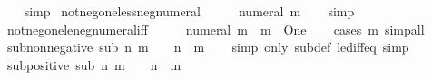 \begin{isabellebody}
%
\isadelimproof
\ \ %
\endisadelimproof
%
\isatagproof
{}\isamarkupfalse%
\ simp%
\endisatagproof
{\isafoldproof}%
%
\isadelimproof
\isanewline
%
\endisadelimproof
\isanewline
{}\isamarkupfalse%
\ not{\isacharunderscore}{\kern0pt}neg{\isacharunderscore}{\kern0pt}one{\isacharunderscore}{\kern0pt}less{\isacharunderscore}{\kern0pt}neg{\isacharunderscore}{\kern0pt}numeral{\isacharcolon}{\kern0pt}\ {\isachardoublequoteopen}{\isasymnot}\ {\isacharminus}{\kern0pt}\ {}\ {\isacharless}{\kern0pt}\ {\isacharminus}{\kern0pt}\ numeral\ m{\isachardoublequoteclose}\isanewline
%
\isadelimproof
\ \ %
\endisadelimproof
%
\isatagproof
{}\isamarkupfalse%
\ simp%
\endisatagproof
{\isafoldproof}%
%
\isadelimproof
\isanewline
%
\endisadelimproof
\isanewline
{}\isamarkupfalse%
\ not{\isacharunderscore}{\kern0pt}neg{\isacharunderscore}{\kern0pt}one{\isacharunderscore}{\kern0pt}le{\isacharunderscore}{\kern0pt}neg{\isacharunderscore}{\kern0pt}numeral{\isacharunderscore}{\kern0pt}iff{\isacharcolon}{\kern0pt}\ {\isachardoublequoteopen}{\isasymnot}\ {\isacharminus}{\kern0pt}\ {}\ {\isasymle}\ {\isacharminus}{\kern0pt}\ numeral\ m\ {\isasymlongleftrightarrow}\ m\ {\isasymnoteq}\ One{\isachardoublequoteclose}\isanewline
%
\isadelimproof
\ \ %
\endisadelimproof
%
\isatagproof
{}\isamarkupfalse%
\ {\isacharparenleft}{\kern0pt}cases\ m{\isacharparenright}{\kern0pt}\ simp{\isacharunderscore}{\kern0pt}all%
\endisatagproof
{\isafoldproof}%
%
\isadelimproof
\isanewline
%
\endisadelimproof
\isanewline
{}\isamarkupfalse%
\ sub{\isacharunderscore}{\kern0pt}non{\isacharunderscore}{\kern0pt}negative{\isacharcolon}{\kern0pt}\ {\isachardoublequoteopen}sub\ n\ m\ {\isasymge}\ {}\ {\isasymlongleftrightarrow}\ n\ {\isasymge}\ m{\isachardoublequoteclose}\isanewline
%
\isadelimproof
\ \ %
\endisadelimproof
%
\isatagproof
{}\isamarkupfalse%
\ {\isacharparenleft}{\kern0pt}simp\ only{\isacharcolon}{\kern0pt}\ sub{\isacharunderscore}{\kern0pt}def\ le{\isacharunderscore}{\kern0pt}diff{\isacharunderscore}{\kern0pt}eq{\isacharparenright}{\kern0pt}\ simp%
\endisatagproof
{\isafoldproof}%
%
\isadelimproof
\isanewline
%
\endisadelimproof
\isanewline
{}\isamarkupfalse%
\ sub{\isacharunderscore}{\kern0pt}positive{\isacharcolon}{\kern0pt}\ {\isachardoublequoteopen}sub\ n\ m\ {\isachargreater}{\kern0pt}\ {}\ {\isasymlongleftrightarrow}\ n\ {\isachargreater}{\kern0pt}\ m{\isachardoublequoteclose}\isanewline
%
\isadelimproof
\ \ %
\endisadelimproof
%
\isatagproof

\end{isabellebody}
